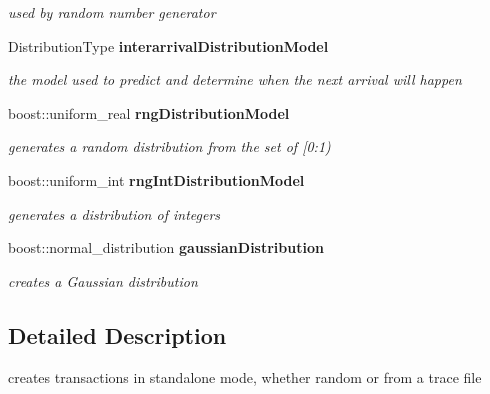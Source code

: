 \begin{CompactItemize}
\begin{CompactList}\small\item\em used by random number generator \item\end{CompactList}\item 
DistributionType {\bf interarrivalDistributionModel}\label{class_d_r_a_msim_i_i_1_1_input_stream_e737c9eeccab11eaf2f7226ddba00c63}

\begin{CompactList}\small\item\em the model used to predict and determine when the next arrival will happen \item\end{CompactList}\item 
boost::uniform\_\-real {\bf rngDistributionModel}\label{class_d_r_a_msim_i_i_1_1_input_stream_8e535060eac21b385c56530f010413a6}

\begin{CompactList}\small\item\em generates a random distribution from the set of [0:1) \item\end{CompactList}\item 
boost::uniform\_\-int {\bf rngIntDistributionModel}\label{class_d_r_a_msim_i_i_1_1_input_stream_a1344a84d478d44279a777e820dcf9cb}

\begin{CompactList}\small\item\em generates a distribution of integers \item\end{CompactList}\item 
boost::normal\_\-distribution {\bf gaussianDistribution}\label{class_d_r_a_msim_i_i_1_1_input_stream_1932e8903b183eeb9e6fbd36b4e738ad}

\begin{CompactList}\small\item\em creates a Gaussian distribution \item\end{CompactList}\end{CompactItemize}


\subsection{Detailed Description}
creates transactions in standalone mode, whether random or from a trace file 

